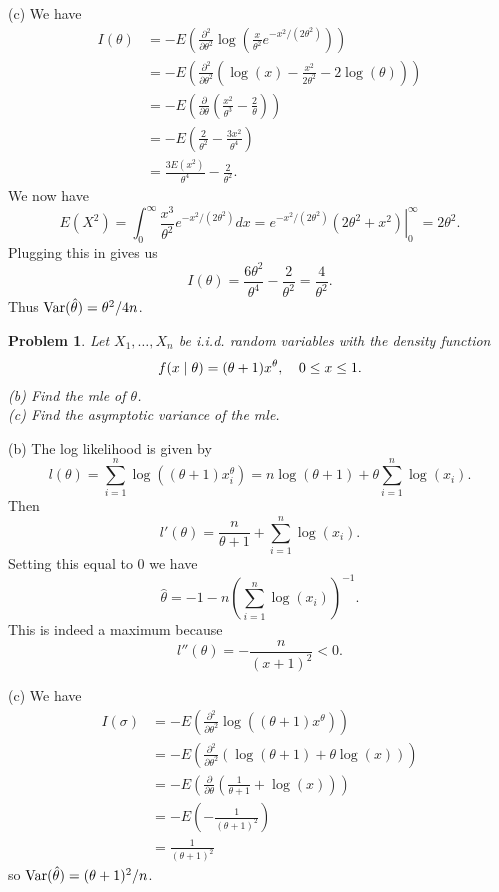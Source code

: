 \documentclass{article}
\newtheorem{problem}{Problem}
\newcommand{\var}{\textup{Var}}
\begin{document}
(c) We have
\begin{align*}
I(\theta)
&= -E \left ( \frac{\partial^2}{\partial \theta^2} \log \left ( \frac{x}{\theta^2}e^{-x^2/(2 \theta^2)} \right ) \right )\\
&= -E \left ( \frac{\partial^2}{\partial \theta^2} (\log(x) - \frac{x^2}{2\theta^2} - 2\log(\theta) ) \right )\\
&= -E \left ( \frac{\partial}{\partial \theta} \left ( \frac{x^2}{\theta^3} - \frac{2}{\theta} \right ) \right )\\
&= -E \left (\frac{2}{\theta^2} - \frac{3x^2}{\theta^4} \right )\\
&= \frac{3 E(x^2)}{\theta^4} - \frac{2}{\theta^2}.
\end{align*}
We now have
\[
E(X^2) = \int_0^{\infty} \frac{x^3}{\theta^2}e^{-x^2/(2 \theta^2)} dx = \left. e^{-x^2/(2\theta^2)}(2 \theta^2 + x^2) \right |_0^{\infty} = 2 \theta^2.
\]
Plugging this in gives us
\[
I(\theta) = \frac{6 \theta^2}{\theta^4} - \frac{2}{\theta^2} = \frac{4}{\theta^2}.
\]
Thus $\var(\hat{\theta}) = \theta^2/4n$.

\begin{problem}
Let $X_1, \dots , X_n$ be i.i.d. random variables with the density function
\[
\begin{tabular}{cc}
$\displaystyle{f(x \mid \theta) = (\theta + 1)x^{\theta}}$, & $\displaystyle{0 \leq x \leq 1}$.
\end{tabular}
\]
(b) Find the mle of $\theta$.\\
(c) Find the asymptotic variance of the mle.
\end{problem}

(b) The log likelihood is given by
\[
l(\theta) = \sum_{i=1}^n \log \left ( (\theta + 1)x_i^\theta \right ) = n \log (\theta + 1) + \theta \sum_{i=1}^n \log(x_i).
\]
Then
\[
l'(\theta) = \frac{n}{\theta + 1} + \sum_{i=1}^n \log(x_i).
\]
Setting this equal to $0$ we have
\[
\hat{\theta} = -1 - n \left ( \sum_{i=1}^n \log(x_i) \right )^{-1}.
\]
This is indeed a maximum because
\[
l''(\theta) = -\frac{n}{(x+1)^2} < 0.
\]

(c) We have
\begin{align*}
I(\sigma)
&= -E \left ( \frac{\partial^2}{\partial \theta^2} \log \left ( (\theta + 1)x^{\theta} \right ) \right )\\
&= -E \left ( \frac{\partial^2}{\partial \theta^2} (\log(\theta + 1) + \theta \log(x) ) \right )\\
&= -E \left ( \frac{\partial}{\partial \theta} \left ( \frac{1}{\theta + 1} + \log(x) \right ) \right )\\
&= -E \left (-\frac{1}{(\theta + 1)^2} \right )\\
&= \frac{1}{(\theta + 1)^2}
\end{align*}
so $\var(\hat{\theta}) = (\theta + 1)^2/n$.
\end{document}
